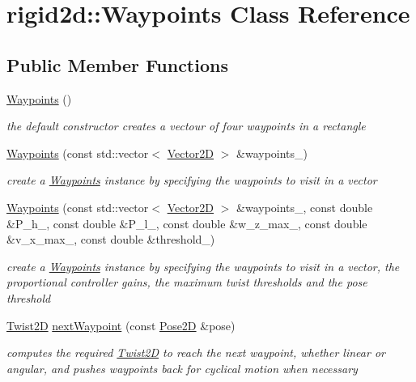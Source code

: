 \hypertarget{classrigid2d_1_1Waypoints}{}\section{rigid2d\+:\+:Waypoints Class Reference}
\label{classrigid2d_1_1Waypoints}
\subsection*{Public Member Functions}
\begin{DoxyCompactItemize}
\item 
\mbox{\label{classrigid2d_1_1Waypoints_a8e7579d65c588966c0f53866a73fee43}} 
\hyperlink{classrigid2d_1_1Waypoints_a8e7579d65c588966c0f53866a73fee43}{Waypoints} ()
\begin{DoxyCompactList}\small\item\em the default constructor creates a vectour of four waypoints in a rectangle \end{DoxyCompactList}\item 
\hyperlink{classrigid2d_1_1Waypoints_a2d80cabdd52bc5291ddab198be441618}{Waypoints} (const std\+::vector$<$ \hyperlink{structrigid2d_1_1Vector2D}{Vector2D} $>$ \&waypoints\+\_\+)
\begin{DoxyCompactList}\small\item\em create a \hyperlink{classrigid2d_1_1Waypoints}{Waypoints} instance by specifying the waypoints to visit in a vector \end{DoxyCompactList}\item 
\hyperlink{classrigid2d_1_1Waypoints_a45bc2c3d9687047b403d08f14456961e}{Waypoints} (const std\+::vector$<$ \hyperlink{structrigid2d_1_1Vector2D}{Vector2D} $>$ \&waypoints\+\_\+, const double \&P\+\_\+h\+\_\+, const double \&P\+\_\+l\+\_\+, const double \&w\+\_\+z\+\_\+max\+\_\+, const double \&v\+\_\+x\+\_\+max\+\_\+, const double \&threshold\+\_\+)
\begin{DoxyCompactList}\small\item\em create a \hyperlink{classrigid2d_1_1Waypoints}{Waypoints} instance by specifying the waypoints to visit in a vector, the proportional controller gains, the maximum twist thresholds and the pose threshold \end{DoxyCompactList}\item 
\hyperlink{classrigid2d_1_1Twist2D}{Twist2D} \hyperlink{classrigid2d_1_1Waypoints_a9431a48c1fad67270b4fe27712fee09a}{next\+Waypoint} (const \hyperlink{structrigid2d_1_1Pose2D}{Pose2D} \&pose)
\begin{DoxyCompactList}\small\item\em computes the required \hyperlink{classrigid2d_1_1Twist2D}{Twist2D} to reach the next waypoint, whether linear or angular, and pushes waypoints back for cyclical motion when necessary \end{DoxyCompactList}\end{DoxyCompactItemize}


